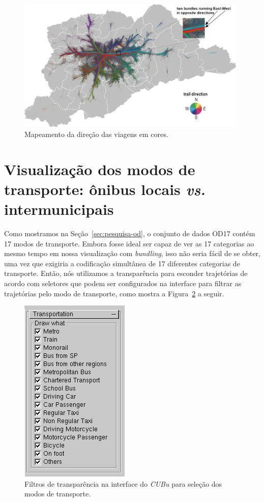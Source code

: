 \begin{figure}[!htb]
  \centering
  \captionsetup{justification=centering}
  \includegraphics[width=0.98\textwidth]{../figuras/directions.png}
  \caption{Mapeamento da direção das viagens em cores. \label{fig:attributes-direction}}
\end{figure}

\section{Visualização dos modos de transporte: ônibus locais \emph{vs.} intermunicipais}
\label{sec:coloring}

Como mostramos na Seção~\ref{sec:pesquisa-od}, o conjunto de dados OD17 contém
17 modos de transporte. Embora fosse ideal ser capaz de ver as 17 categorias ao
mesmo tempo em nossa visualização com \emph{bundling}, isso não seria fácil de
se obter, uma vez que exigiria a codificação simultânea de 17 diferentes
categorias de transporte. Então, nós utilizamos a transparência para esconder
trajetórias de acordo com seletores que podem ser configurados na interface para
filtrar as trajetórias pelo modo de transporte, como mostra a Figura~\ref{fig:filtros-modes}
a seguir.

\begin{figure}[!h]
  \centering
  \includegraphics[width=.27\textwidth]{../figuras/filtros-modes.png}
  \caption{Filtros de transparência na interface do \emph{CUBu} para seleção dos modos de transporte.}
   \label{fig:filtros-modes}
 \end{figure}

